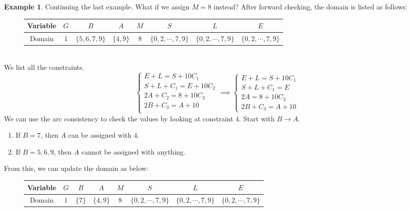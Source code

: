 \documentclass{article}
\theoremstyle{definition}
\newtheorem{example}{Example}[definition]
\begin{document}
\newpage
\begin{example}
	Continuing the last example. What if we assign $M=8$ instead? After forward checking, the domain is listed as follows:
	\begin{figure}[h]
		\centering
		\begin{tabular}{|c||c|c|c|c|c|c|c|}
			\hline
			Variable & $G$ & $B$ & $A$ & $M$ & $S$ & $L$ & $E$\\
			\hline
			Domain & $1$ & $\{5,6,7,9\}$ & $\{4,9\}$ & $8$ & $\{0,2,\cdots,7,9\}$ & $\{0,2,\cdots,7,9\}$ & $\{0,2,\cdots,7,9\}$\\
			\hline
		\end{tabular}
	\end{figure}\\
	We list all the constraints.
	\begin{equation*}
		\begin{cases}
			E+L=S+10C_{1}\\
			S+L+C_{1}=E+10C_{2}\\
			2A+C_{2}=8+10C_{3}\\
			2B+C_{3}=A+10\\
		\end{cases}\implies\begin{cases}
			E+L=S+10C_{1}\\
			S+L+C_{1}=E\\
			2A=8+10C_{3}\\
			2B+C_{3}=A+10
		\end{cases}
	\end{equation*}
	We can use the arc consistency to check the values by looking at constraint $4$. Start with $B\to A$.
	\begin{enumerate}
		\item If $B=7$, then $A$ can be assigned with $4$.
		\item If $B=5,6,9$, then $A$ cannot be assigned with anything. 
	\end{enumerate}
	From this, we can update the domain as below:
	\begin{figure}[h]
		\centering
		\begin{tabular}{|c||c|c|c|c|c|c|c|}
			\hline
			Variable & $G$ & $B$ & $A$ & $M$ & $S$ & $L$ & $E$\\
			\hline
			Domain & $1$ & $\{7\}$ & $\{4,9\}$ & $8$ & $\{0,2,\cdots,7,9\}$ & $\{0,2,\cdots,7,9\}$ & $\{0,2,\cdots,7,9\}$\\
			\hline
		\end{tabular}
	\end{figure}\\

\end{example}
\end{document}
